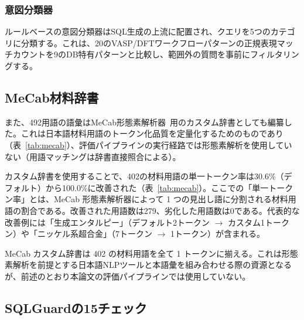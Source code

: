 \documentclass[twocolumn]{interact}
\makeatletter
\def\toprule{\noalign{\ifnum0=`}\fi
  \@aboverulesep=\abovetopsep
  \global\@belowrulesep=\belowrulesep
  \global\@thisruleclass=\@ne
  \@ifnextchar[{\@BTrule}{\@BTrule[\heavyrulewidth]}}
\def\midrule{\noalign{\ifnum0=`}\fi
  \@aboverulesep=\aboverulesep
  \global\@belowrulesep=\belowrulesep
  \global\@thisruleclass=\@ne
  \@ifnextchar[{\@BTrule}{\@BTrule[\lightrulewidth]}}
\def\bottomrule{\noalign{\ifnum0=`}\fi
  \@aboverulesep=\aboverulesep
  \global\@belowrulesep=\belowbottomsep
  \global\@thisruleclass=\@ne
  \@ifnextchar[{\@BTrule}{\@BTrule[\heavyrulewidth]}}
\makeatother
\begin{document}
\subsubsection{意図分類器}

ルールベースの意図分類器はSQL生成の上流に配置され、クエリを5つのカテゴリに分類する。これは、20のVASP/DFTワークフローパターンの正規表現マッチカウントを9のDB特有パターンと比較し、範囲外の質問を事前にフィルタリングする。


\subsection{MeCab材料辞書}

また、492用語の語彙はMeCab形態素解析器~\cite{kudo2004mecab}用のカスタム辞書としても編纂した。これは日本語材料用語のトークン化品質を定量化するためのものであり（表~\ref{tab:mecab}）、評価パイプラインの実行経路では形態素解析を使用していない（用語マッチングは辞書直接照合による）。

カスタム辞書を使用することで、402の材料用語の単一トークン率は30.6\%（デフォルト）から100.0\%に改善された（表~\ref{tab:mecab}）。ここでの「単一トークン率」とは、MeCab 形態素解析器によって 1 つの見出し語に分割される材料用語の割合である。改善された用語数は279、劣化した用語数は0である。代表的な改善例には「生成エンタルピー」（デフォルト2トークン $\to$ カスタム1トークン）や「ニッケル系超合金」（7トークン $\to$ 1トークン）が含まれる。

\begin{table}[htbp]
\centering
\caption{MeCab材料辞書がトークン化に与える影響。
402の材料用語に対する単一トークン率。}
\label{tab:mecab}
\footnotesize
{}
\end{table}

MeCab カスタム辞書は 402 の材料用語を全て 1 トークンに揃える。これは形態素解析を前提とする日本語NLPツールと本語彙を組み合わせる際の資源となるが、前述のとおり本論文の評価パイプラインでは使用していない。


\subsection{SQLGuardの15チェック}
\end{document}
